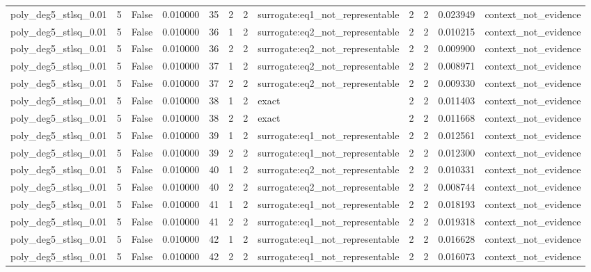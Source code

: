 \begin{tabular}{lrrrrrrlrrrl}
poly\_deg5\_stlsq\_0.01 & 5 & False & 0.010000 & 35 & 2 & 2 & surrogate:eq1\_not\_representable & 2 & 2 & 0.023949 & context\_not\_evidence \\
poly\_deg5\_stlsq\_0.01 & 5 & False & 0.010000 & 36 & 1 & 2 & surrogate:eq2\_not\_representable & 2 & 2 & 0.010215 & context\_not\_evidence \\
poly\_deg5\_stlsq\_0.01 & 5 & False & 0.010000 & 36 & 2 & 2 & surrogate:eq2\_not\_representable & 2 & 2 & 0.009900 & context\_not\_evidence \\
poly\_deg5\_stlsq\_0.01 & 5 & False & 0.010000 & 37 & 1 & 2 & surrogate:eq2\_not\_representable & 2 & 2 & 0.008971 & context\_not\_evidence \\
poly\_deg5\_stlsq\_0.01 & 5 & False & 0.010000 & 37 & 2 & 2 & surrogate:eq2\_not\_representable & 2 & 2 & 0.009330 & context\_not\_evidence \\
poly\_deg5\_stlsq\_0.01 & 5 & False & 0.010000 & 38 & 1 & 2 & exact & 2 & 2 & 0.011403 & context\_not\_evidence \\
poly\_deg5\_stlsq\_0.01 & 5 & False & 0.010000 & 38 & 2 & 2 & exact & 2 & 2 & 0.011668 & context\_not\_evidence \\
poly\_deg5\_stlsq\_0.01 & 5 & False & 0.010000 & 39 & 1 & 2 & surrogate:eq1\_not\_representable & 2 & 2 & 0.012561 & context\_not\_evidence \\
poly\_deg5\_stlsq\_0.01 & 5 & False & 0.010000 & 39 & 2 & 2 & surrogate:eq1\_not\_representable & 2 & 2 & 0.012300 & context\_not\_evidence \\
poly\_deg5\_stlsq\_0.01 & 5 & False & 0.010000 & 40 & 1 & 2 & surrogate:eq2\_not\_representable & 2 & 2 & 0.010331 & context\_not\_evidence \\
poly\_deg5\_stlsq\_0.01 & 5 & False & 0.010000 & 40 & 2 & 2 & surrogate:eq2\_not\_representable & 2 & 2 & 0.008744 & context\_not\_evidence \\
poly\_deg5\_stlsq\_0.01 & 5 & False & 0.010000 & 41 & 1 & 2 & surrogate:eq1\_not\_representable & 2 & 2 & 0.018193 & context\_not\_evidence \\
poly\_deg5\_stlsq\_0.01 & 5 & False & 0.010000 & 41 & 2 & 2 & surrogate:eq1\_not\_representable & 2 & 2 & 0.019318 & context\_not\_evidence \\
poly\_deg5\_stlsq\_0.01 & 5 & False & 0.010000 & 42 & 1 & 2 & surrogate:eq1\_not\_representable & 2 & 2 & 0.016628 & context\_not\_evidence \\
poly\_deg5\_stlsq\_0.01 & 5 & False & 0.010000 & 42 & 2 & 2 & surrogate:eq1\_not\_representable & 2 & 2 & 0.016073 & context\_not\_evidence \\

\end{tabular}
